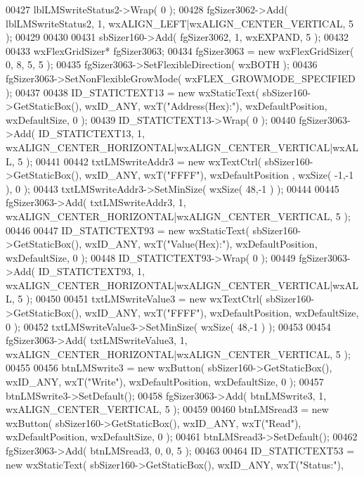 \begin{DoxyCode}
00427     lblLMSwriteStatus2->Wrap( 0 );
00428     fgSizer3062->Add( lblLMSwriteStatus2, 1, wxALIGN\_LEFT|wxALIGN\_CENTER\_VERTICAL, 5 );
00429     
00430     
00431     sbSizer160->Add( fgSizer3062, 1, wxEXPAND, 5 );
00432     
00433     wxFlexGridSizer* fgSizer3063;
00434     fgSizer3063 = \textcolor{keyword}{new} wxFlexGridSizer( 0, 8, 5, 5 );
00435     fgSizer3063->SetFlexibleDirection( wxBOTH );
00436     fgSizer3063->SetNonFlexibleGrowMode( wxFLEX\_GROWMODE\_SPECIFIED );
00437     
00438     ID_STATICTEXT13 = \textcolor{keyword}{new} wxStaticText( sbSizer160->GetStaticBox(), wxID\_ANY, wxT(\textcolor{stringliteral}{"Address(Hex):"}), 
      wxDefaultPosition, wxDefaultSize, 0 );
00439     ID_STATICTEXT13->Wrap( 0 );
00440     fgSizer3063->Add( ID_STATICTEXT13, 1, wxALIGN\_CENTER\_HORIZONTAL|wxALIGN\_CENTER\_VERTICAL|wxALL, 5 );
00441     
00442     txtLMSwriteAddr3 = \textcolor{keyword}{new} wxTextCtrl( sbSizer160->GetStaticBox(), wxID\_ANY, wxT(\textcolor{stringliteral}{"FFFF"}), wxDefaultPosition
      , wxSize( -1,-1 ), 0 );
00443     txtLMSwriteAddr3->SetMinSize( wxSize( 48,-1 ) );
00444     
00445     fgSizer3063->Add( txtLMSwriteAddr3, 1, wxALIGN\_CENTER\_HORIZONTAL|wxALIGN\_CENTER\_VERTICAL, 5 );
00446     
00447     ID_STATICTEXT93 = \textcolor{keyword}{new} wxStaticText( sbSizer160->GetStaticBox(), wxID\_ANY, wxT(\textcolor{stringliteral}{"Value(Hex):"}), 
      wxDefaultPosition, wxDefaultSize, 0 );
00448     ID_STATICTEXT93->Wrap( 0 );
00449     fgSizer3063->Add( ID_STATICTEXT93, 1, wxALIGN\_CENTER\_HORIZONTAL|wxALIGN\_CENTER\_VERTICAL|wxALL, 5 );
00450     
00451     txtLMSwriteValue3 = \textcolor{keyword}{new} wxTextCtrl( sbSizer160->GetStaticBox(), wxID\_ANY, wxT(\textcolor{stringliteral}{"FFFF"}), 
      wxDefaultPosition, wxDefaultSize, 0 );
00452     txtLMSwriteValue3->SetMinSize( wxSize( 48,-1 ) );
00453     
00454     fgSizer3063->Add( txtLMSwriteValue3, 1, wxALIGN\_CENTER\_HORIZONTAL|wxALIGN\_CENTER\_VERTICAL, 5 );
00455     
00456     btnLMSwrite3 = \textcolor{keyword}{new} wxButton( sbSizer160->GetStaticBox(), wxID\_ANY, wxT(\textcolor{stringliteral}{"Write"}), wxDefaultPosition, 
      wxDefaultSize, 0 );
00457     btnLMSwrite3->SetDefault(); 
00458     fgSizer3063->Add( btnLMSwrite3, 1, wxALIGN\_CENTER\_VERTICAL, 5 );
00459     
00460     btnLMSread3 = \textcolor{keyword}{new} wxButton( sbSizer160->GetStaticBox(), wxID\_ANY, wxT(\textcolor{stringliteral}{"Read"}), wxDefaultPosition, 
      wxDefaultSize, 0 );
00461     btnLMSread3->SetDefault(); 
00462     fgSizer3063->Add( btnLMSread3, 0, 0, 5 );
00463     
00464     ID_STATICTEXT53 = \textcolor{keyword}{new} wxStaticText( sbSizer160->GetStaticBox(), wxID\_ANY, wxT(\textcolor{stringliteral}{"Status:"}), 

\end{DoxyCode}
